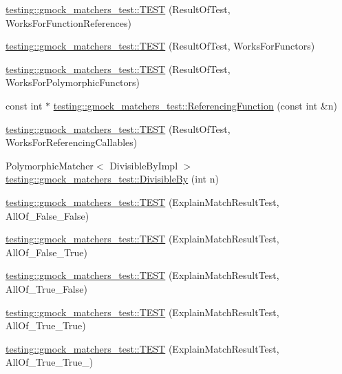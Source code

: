 \begin{DoxyCompactItemize}
\item 
\mbox{\hyperlink{namespacetesting_1_1gmock__matchers__test_a1638ee6460100cbe21c65b6cdc06579a}{testing\+::gmock\+\_\+matchers\+\_\+test\+::\+T\+E\+ST}} (Result\+Of\+Test, Works\+For\+Function\+References)
\item 
\mbox{\hyperlink{namespacetesting_1_1gmock__matchers__test_a19b7a39915f7ad5a0b741caf7ae4e619}{testing\+::gmock\+\_\+matchers\+\_\+test\+::\+T\+E\+ST}} (Result\+Of\+Test, Works\+For\+Functors)
\item 
\mbox{\hyperlink{namespacetesting_1_1gmock__matchers__test_a976290e53e319b06c51a94f7e450d765}{testing\+::gmock\+\_\+matchers\+\_\+test\+::\+T\+E\+ST}} (Result\+Of\+Test, Works\+For\+Polymorphic\+Functors)
\item 
const int $\ast$ \mbox{\hyperlink{namespacetesting_1_1gmock__matchers__test_af3164fc302e0b727c1eb745bdeb959f6}{testing\+::gmock\+\_\+matchers\+\_\+test\+::\+Referencing\+Function}} (const int \&n)
\item 
\mbox{\hyperlink{namespacetesting_1_1gmock__matchers__test_a00ee08657c9e9e0c306be7b84cd2848c}{testing\+::gmock\+\_\+matchers\+\_\+test\+::\+T\+E\+ST}} (Result\+Of\+Test, Works\+For\+Referencing\+Callables)
\item 
Polymorphic\+Matcher$<$ Divisible\+By\+Impl $>$ \mbox{\hyperlink{namespacetesting_1_1gmock__matchers__test_ac5b1fd3b6a8141c7e83ef6040ed4630f}{testing\+::gmock\+\_\+matchers\+\_\+test\+::\+Divisible\+By}} (int n)
\item 
\mbox{\hyperlink{namespacetesting_1_1gmock__matchers__test_aa9a60a406d9f495de8c8552abf577dd1}{testing\+::gmock\+\_\+matchers\+\_\+test\+::\+T\+E\+ST}} (Explain\+Match\+Result\+Test, All\+Of\+\_\+\+False\+\_\+\+False)
\item 
\mbox{\hyperlink{namespacetesting_1_1gmock__matchers__test_a099aebb5417d5bd85e11aefe935ec345}{testing\+::gmock\+\_\+matchers\+\_\+test\+::\+T\+E\+ST}} (Explain\+Match\+Result\+Test, All\+Of\+\_\+\+False\+\_\+\+True)
\item 
\mbox{\hyperlink{namespacetesting_1_1gmock__matchers__test_a5d386691eaed59994a1d2b65f94b23a9}{testing\+::gmock\+\_\+matchers\+\_\+test\+::\+T\+E\+ST}} (Explain\+Match\+Result\+Test, All\+Of\+\_\+\+True\+\_\+\+False)
\item 
\mbox{\hyperlink{namespacetesting_1_1gmock__matchers__test_a16545b298640b253502d604f52ea95e2}{testing\+::gmock\+\_\+matchers\+\_\+test\+::\+T\+E\+ST}} (Explain\+Match\+Result\+Test, All\+Of\+\_\+\+True\+\_\+\+True)
\item 
\mbox{\hyperlink{namespacetesting_1_1gmock__matchers__test_af1ba4010a24716a51a302f9a518023b5}{testing\+::gmock\+\_\+matchers\+\_\+test\+::\+T\+E\+ST}} (Explain\+Match\+Result\+Test, All\+Of\+\_\+\+True\+\_\+\+True\+\_)

\end{DoxyCompactItemize}
